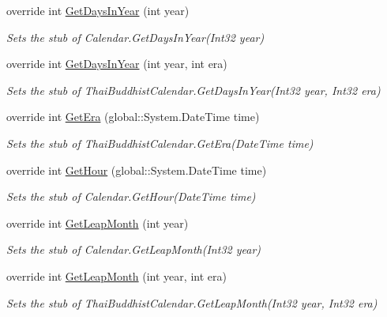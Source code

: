 \begin{DoxyCompactItemize}
override int \hyperlink{class_system_1_1_globalization_1_1_fakes_1_1_stub_thai_buddhist_calendar_aca4f7412377b3c98ce8c61158e7c5cf4}{Get\-Days\-In\-Year} (int year)
\begin{DoxyCompactList}\small\item\em Sets the stub of Calendar.\-Get\-Days\-In\-Year(\-Int32 year)\end{DoxyCompactList}\item 
override int \hyperlink{class_system_1_1_globalization_1_1_fakes_1_1_stub_thai_buddhist_calendar_ac910e5973288406849b7681d48edc023}{Get\-Days\-In\-Year} (int year, int era)
\begin{DoxyCompactList}\small\item\em Sets the stub of Thai\-Buddhist\-Calendar.\-Get\-Days\-In\-Year(\-Int32 year, Int32 era)\end{DoxyCompactList}\item 
override int \hyperlink{class_system_1_1_globalization_1_1_fakes_1_1_stub_thai_buddhist_calendar_a6827851e91c5c8e0e4e4d1f604b898c0}{Get\-Era} (global\-::\-System.\-Date\-Time time)
\begin{DoxyCompactList}\small\item\em Sets the stub of Thai\-Buddhist\-Calendar.\-Get\-Era(\-Date\-Time time)\end{DoxyCompactList}\item 
override int \hyperlink{class_system_1_1_globalization_1_1_fakes_1_1_stub_thai_buddhist_calendar_af5699380288b77b8889bfc8a5112d263}{Get\-Hour} (global\-::\-System.\-Date\-Time time)
\begin{DoxyCompactList}\small\item\em Sets the stub of Calendar.\-Get\-Hour(\-Date\-Time time)\end{DoxyCompactList}\item 
override int \hyperlink{class_system_1_1_globalization_1_1_fakes_1_1_stub_thai_buddhist_calendar_ac20bb8689f3c8bd6c7b334d80f8f6d7e}{Get\-Leap\-Month} (int year)
\begin{DoxyCompactList}\small\item\em Sets the stub of Calendar.\-Get\-Leap\-Month(\-Int32 year)\end{DoxyCompactList}\item 
override int \hyperlink{class_system_1_1_globalization_1_1_fakes_1_1_stub_thai_buddhist_calendar_ae533f1623a443a9d20dd3357cd1de1a7}{Get\-Leap\-Month} (int year, int era)
\begin{DoxyCompactList}\small\item\em Sets the stub of Thai\-Buddhist\-Calendar.\-Get\-Leap\-Month(\-Int32 year, Int32 era)\end{DoxyCompactList}\item 

\end{DoxyCompactItemize}

